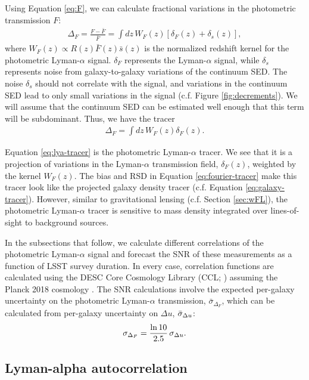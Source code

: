 \documentclass[twocolumn]{aastex631}
\newcommand{\lya}{Lyman-$\alpha$\xspace}
\newcommand{\du}{\Delta u}
\begin{document}
Using Equation \ref{eq:F}, we can calculate fractional variations in the photometric transmission $F$:
\begin{align}
    \Delta_F = \frac{F - \bar{F}}{\bar{F}} = \int dz \, W_F(z)[\delta_F(z) + \delta_s(z)],
\end{align}
where $W_F(z) \propto R(z) \bar{F}(z) \bar{s}(z)$ is the normalized redshift kernel for the photometric \lya signal.
$\delta_F$ represents the \lya signal, while $\delta_s$ represents noise from galaxy-to-galaxy variations of the continuum SED.
The noise $\delta_s$ should not correlate with the signal, and variations in the continuum SED lead to only small variations in the signal (c.f. Figure \ref{fig:decrements}).
We will assume that the continuum SED can be estimated well enough that this term will be subdominant.
Thus, we have the tracer
\begin{align}
    \Delta_F = \int dz \, W_F(z) \delta_F(z).
    \label{eq:lya-tracer}
\end{align}

Equation \ref{eq:lya-tracer} is the photometric \lya tracer.
We see that it is a projection of variations in the \lya transmission field, $\delta_F(z)$, weighted by the kernel $W_F(z)$.
The bias and RSD in Equation \ref{eq:fourier-tracer} make this tracer look like the projected galaxy density tracer (c.f. Equation \ref{eq:galaxy-tracer}).
However, similar to gravitational lensing (c.f. Section \ref{sec:wFL}), the photometric \lya tracer is sensitive to mass density integrated over lines-of-sight to background sources.

In the subsections that follow, we calculate different correlations of the photometric \lya signal and forecast the SNR of these measurements as a function of LSST survey duration.
In every case, correlation functions are calculated using the DESC Core Cosmology Library (CCL; \citealt{ccl}) assuming the Planck 2018 cosmology \citep{planck2018}.
The SNR calculations involve the expected per-galaxy uncertainty on the photometric \lya transmission, $\bar{\sigma}_{\Delta_F}$, which can be calculated from per-galaxy uncertainty on $\du$, $\bar{\sigma}_{\small \du}$:
\begin{align}
    \sigma_{\Delta_F} = \frac{\ln 10}{2.5} \, \sigma_{\small \du}.
\end{align}

\subsection{Lyman-alpha autocorrelation}
\label{sec:wFF}
\end{document}
